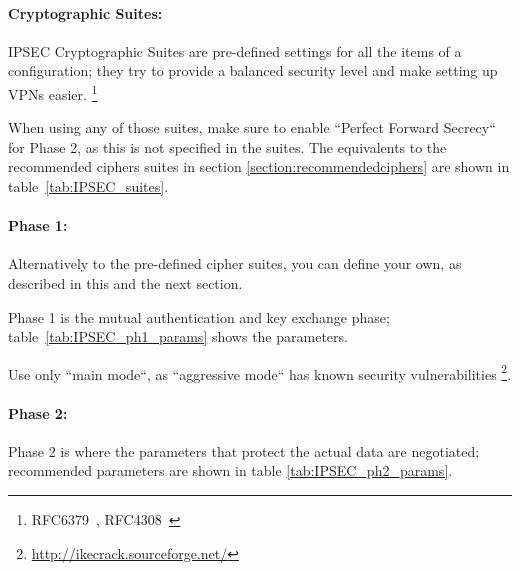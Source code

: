 \paragraph{Cryptographic Suites:}
IPSEC Cryptographic Suites are pre-defined settings for all the items
of a configuration; they try to provide a balanced security level and
make setting up VPNs easier.
\footnote{RFC6379~\cite{rfc6379}, RFC4308~\cite{rfc4308}}

When using any of those suites, make sure to enable ``Perfect Forward
Secrecy`` for Phase 2, as this is not specified in the suites. The
equivalents to the recommended ciphers suites in section
\ref{section:recommendedciphers} are shown in
table~\ref{tab:IPSEC_suites}.

\paragraph{Phase 1:}

Alternatively to the pre-defined cipher suites, you can define your
own, as described in this and the next section.

Phase 1 is the mutual authentication and key exchange phase;
table~\ref{tab:IPSEC_ph1_params} shows the parameters.

Use only ``main mode``, as ``aggressive mode`` has known security
vulnerabilities \footnote{\url{http://ikecrack.sourceforge.net/}}.


\paragraph{Phase 2:}
Phase 2 is where the parameters that protect the actual data are negotiated; recommended
parameters are shown in table \ref{tab:IPSEC_ph2_params}.

